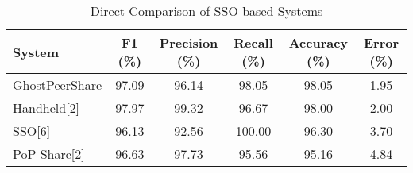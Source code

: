 \begin{table}[b!]
\centering
\begin{tabular}{lccccc}
\hline
\textbf{System} & \textbf{F1 (\%)} & \textbf{Precision (\%)} & \textbf{Recall (\%)} & \textbf{Accuracy (\%)} & \textbf{Error (\%)} \\
\hline
GhostPeerShare & 97.09 & 96.14 & 98.05 & 98.05 & 1.95 \\
Handheld[2]    & 97.97 & 99.32 & 96.67 & 98.00 & 2.00 \\
SSO[6]         & 96.13 & 92.56 & 100.00 & 96.30 & 3.70 \\
PoP-Share[2]   & 96.63 & 97.73 & 95.56 & 95.16 & 4.84 \\
\hline
\end{tabular}
\caption{Direct Comparison of SSO-based Systems}
\label{table:ann_system_compare}
\end{table}
